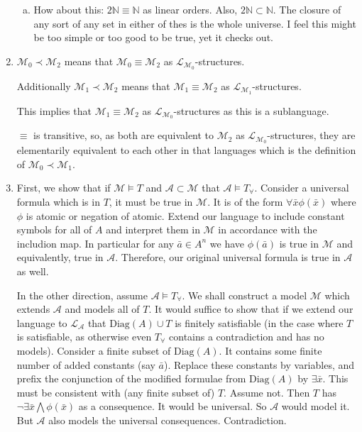 \documentclass[10pt]{article}
\newcommand{\N}{\mathbb{N}}
\newcommand{\A}{\forall}
\newcommand{\mcA}{\mathcal{A}}
\newcommand{\mcM}{\mathcal{M}}
\newcommand{\mcL}{\mathcal{L}}
\newcommand{\E}{\exists}
\begin{document}
\begin{enumerate}[1.]
\begin{enumerate}[a)]
  \item How about this: \(2\N \equiv \N\) as linear orders. Also, \(2\N \subset \N\). The closure of any sort of any set in either of thes is the whole universe. I feel this might be too simple or too good to be true, yet it checks out. 

\end{enumerate}

\item \(\mcM_0 \prec \mcM_2\) means that \(\mcM_0 \equiv \mcM_2\) as \(\mcL_{\mcM_0}\)-structures. 

Additionally \(\mcM_1 \prec \mcM_2\) means that \(\mcM_1 \equiv \mcM_2\) as \(\mcL_{\mcM_1}\)-structures. 

This implies that \(\mcM_1 \equiv \mcM_2\) as \(\mcL_{\mcM_0}\)-structures as this is a sublanguage. 

\(\equiv\) is transitive, so, as both are equivalent to \(\mcM_2\) as \(\mcL_{\mcM_0}\)-structures, they are elementarily equivalent to each other in that languages which is the definition of \(\mcM_0 \prec \mcM_1\). 
 

\item First, we show that if \(\mcM \models T\) and \(\mcA \subset \mcM\) that \(\mcA \models T_\A\). Consider a universal formula which is in \(T\), it must be true in \(\mcM\). It is of the form \(\A\bar{x}\phi(\bar{x})\) where \(\phi\) is atomic or negation of atomic. Extend our language to include constant symbols for all of \(A\) and interpret them in \(\mcM\) in accordance with the includion map. In particular for any \(\bar{a} \in A^n\) we have \(\phi(\bar{a})\) is true in \(\mcM\) and equivalently, true in \(\mcA\). Therefore, our original universal formula is true in \(\mcA\) as well. 

In the other direction, assume \(\mcA \models T_\A\). We shall construct a model \(\mcM\) which extends \(\mcA\) and models all of \(T\). It would suffice to show that if we extend our language to \(\mcL_\mcA\) that \(\text{Diag}(A) \cup T\) is finitely satisfiable (in the case where \(T\) is satisfiable, as otherwise even \(T_\A\) contains a contradiction and has no models). Consider a finite subset of \(\text{Diag}(A)\). It contains some finite number of added constants (say \(\bar{a}\)). Replace these constants by variables, and prefix the conjunction of the modified formulae from \(\text{Diag}(A)\) by \(\E\bar{x}\). This must be consistent with (any finite subset of) \(T\). Assume not. Then \(T\) has \(\neg\E\bar{x}\bigwedge \phi(\bar{x})\) as a consequence. It would be universal. So \(\mcA\) would model it. But \(\mcA\) also models the universal consequences. Contradiction.   


\end{enumerate}
\end{document}
